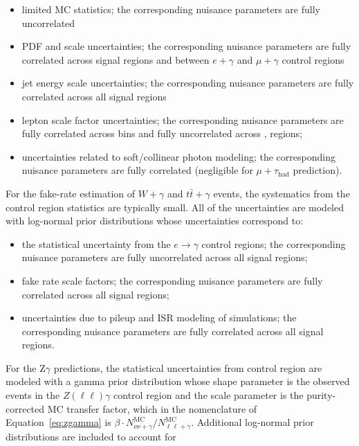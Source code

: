 \begin{itemize}
 \item limited MC statistics; the corresponding nuisance parameters are fully uncorrelated
 \item PDF and scale uncertainties; the corresponding nuisance parameters are fully correlated across signal regions and between $e+\gamma$ and $\mu+\gamma$ control regions
 \item jet energy scale uncertainties; the corresponding nuisance parameters are fully correlated across all signal regions
 \item lepton scale factor uncertainties; the corresponding nuisance parameters are fully correlated across \ptmiss bins and fully uncorrelated across \nb, \nj regions;
 \item uncertainties related to soft/collinear photon modeling; the corresponding nuisance parameters are fully correlated (negligible for $\mu+\tau_{\mathrm{had}}$ prediction).
\end{itemize}
For the fake-rate estimation of $W+\gamma$ and $t\bar{t}+\gamma$ events, the systematics
from the control region statistics are typically small.  All of the uncertainties
are modeled with log-normal prior distributions whose uncertainties
correspond to:

\begin{itemize}
 \item the statistical uncertainty from the $e\rightarrow\gamma$ control regions; the corresponding nuisance parameters are fully uncorrelated across all signal regions;
 \item fake rate scale factors; the corresponding nuisance parameters are fully correlated across all signal regions; 
 \item uncertainties due to pileup and ISR modeling of simulations; the corresponding nuisance parameters are fully correlated across all signal regions.
\end{itemize}

For the Z$\gamma$ predictions, the statistical uncertainties from control 
region are modeled with a gamma
prior distribution whose shape parameter is the observed events in the 
$Z(\ell\ell)\gamma$ control region and the scale parameter is the 
purity-corrected MC transfer factor, which in the nomenclature of 
Equation~\ref{eq:zgamma} is 
$\beta\cdot N_{\nu\nu+\gamma}^{\mathrm{MC}}/N_{\ell\ell+\gamma}^{\mathrm{MC}}$.
Additional log-normal prior distributions are included to account 
for


